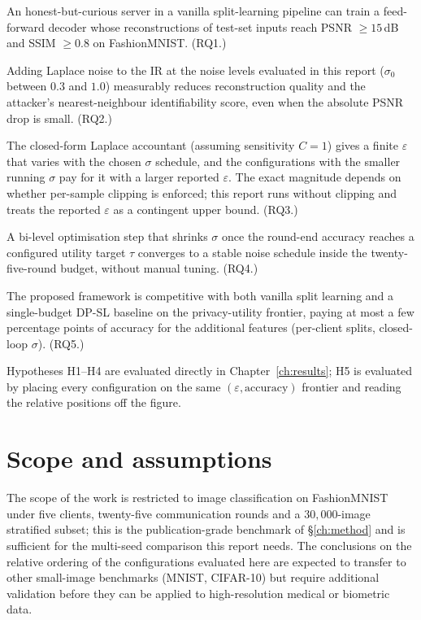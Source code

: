 \documentclass[11pt,a4paper,oneside]{report}
\begin{document}
\begin{description}[itemsep=4pt]
 \item[\textbf{H1.}] An honest-but-curious server in a vanilla
 split-learning pipeline can train a feed-forward decoder whose
 reconstructions of test-set inputs reach PSNR $\geq 15$\,dB
 and SSIM $\geq 0.8$ on FashionMNIST. (RQ1.)
 \item[\textbf{H2.}] Adding Laplace noise to the IR at the noise
 levels evaluated in this report ($\sigma_0$ between $0.3$ and
 $1.0$) measurably reduces reconstruction quality and the
 attacker's nearest-neighbour identifiability score, even when
 the absolute PSNR drop is small.
 (RQ2.)
 \item[\textbf{H3.}] The closed-form Laplace accountant (assuming
 sensitivity $C{=}1$) gives a finite $\varepsilon$ that varies
 with the chosen $\sigma$ schedule, and the configurations with
 the smaller running $\sigma$ pay for it with a larger reported
 $\varepsilon$. The exact magnitude depends on whether
 per-sample clipping is enforced; this report runs without
 clipping and treats the reported $\varepsilon$ as a contingent
 upper bound. (RQ3.)
 \item[\textbf{H4.}] A bi-level optimisation step that shrinks
 $\sigma$ once the round-end accuracy reaches a configured
 utility target $\tau$ converges to a stable noise schedule
 inside the twenty-five-round budget, without manual tuning.
 (RQ4.)
 \item[\textbf{H5.}] The proposed framework is competitive with
 both vanilla split learning and a single-budget DP-SL baseline
 on the privacy-utility frontier, paying at most a few
 percentage points of accuracy for the additional features
 (per-client splits, closed-loop $\sigma$). (RQ5.)
\end{description}

Hypotheses H1--H4 are evaluated directly in Chapter~\ref{ch:results};
H5 is evaluated by placing every configuration on the same
$(\varepsilon, \text{accuracy})$ frontier and reading the relative
positions off the figure.

\section{Scope and assumptions}

The scope of the work is restricted to image classification on
FashionMNIST under five clients, twenty-five communication rounds and
a $30{,}000$-image stratified subset; this is the publication-grade
benchmark of \S\ref{ch:method} and is sufficient for the multi-seed
comparison this report needs. The conclusions on the relative
ordering of the configurations evaluated here are expected to
transfer to other small-image benchmarks (MNIST, CIFAR-10) but
require additional validation before they can be applied to
high-resolution medical or biometric data.
\end{document}
